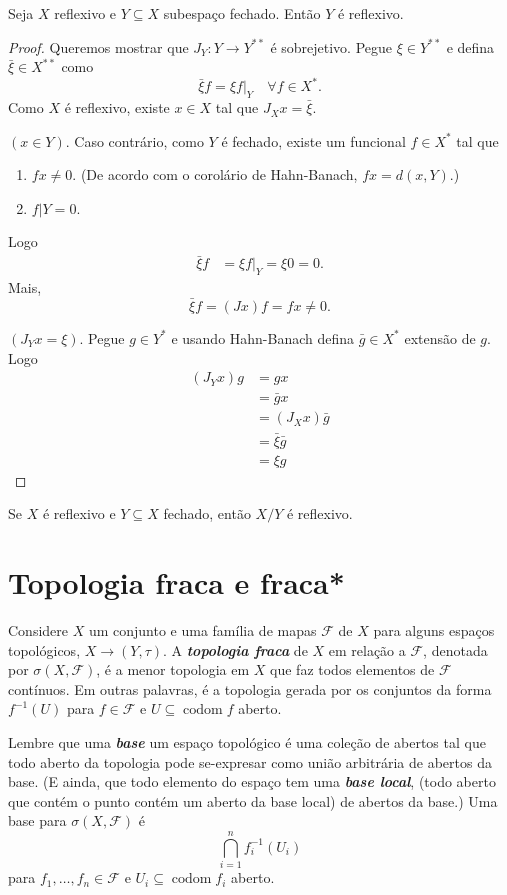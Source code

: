 \documentclass[portuguese]{article}
\theoremstyle{definition}
\begin{document}
	\begin{prop}
		Seja $X$ reflexivo e $Y\subseteq X$ subespaço fechado. Então $Y$ é reflexivo.
	\end{prop}
	\begin{proof}
		Queremos mostrar que $J_Y:Y\to Y^{**}$ é sobrejetivo. Pegue $\xi\in Y^{**}$ e defina $\bar{\xi}\in X^{**}$ como
		\[\bar{\xi}f=\xi f|_Y\quad\forall f\in X^*.\]
		Como $X$ é reflexivo, existe $x\in X$ tal que $J_Xx=\bar{\xi}$.
		
		$(x\in Y)$. Caso contrário, como $Y$ é fechado, existe um funcional $f\in X^*$ tal que
		\begin{enumerate}
			\item $fx\neq0$. (De acordo com o corolário de Hahn-Banach, $fx=d(x,Y)$.)
			\item $f|Y=0$.
		\end{enumerate}
		Logo
		\begin{align*}
			\bar{\xi}f&=\xi f|_Y=\xi0=0.
		\end{align*}
		Mais,
		\[\bar{\xi}f=(Jx)f=fx\neq0.\]
		
		$(J_Yx=\xi)$. Pegue $g\in Y^*$ e usando Hahn-Banach defina $\bar{g}\in X^*$ extensão de $g$. Logo
		\begin{align*}
			(J_Yx)g&=gx\\
			&=\bar{g}x\\
			&=(J_Xx)\bar g\\
			&=\bar{\xi}\bar{g}\\
			&=\xi g
		\end{align*}
	\end{proof}
	\begin{exer*}
		Se $X$ é reflexivo e $Y\subseteq X$ fechado, então $X/Y$ é reflexivo.
	\end{exer*}
	
	\section{Topologia fraca e fraca*}
	Considere $X$ um conjunto e uma família de mapas $\mathcal{F}$ de $X$ para alguns espaços topológicos, $X\to(Y,\tau)$. A \textbf{\textit{topologia fraca}} de $X$ em relação a $\mathcal{F}$, denotada por $\sigma(X,\mathcal{F})$, é a menor topologia em $X$ que faz todos elementos de $\mathcal{F}$ contínuos. Em outras palavras, é a topologia gerada por os conjuntos da forma $f^{-1}(U)$ para $f\in\mathcal{F}$ e $U\subseteq\operatorname{codom}f$ aberto.
	
	Lembre que uma \textbf{\textit{base}} um espaço topológico é uma coleção de abertos tal que todo aberto da topologia pode se-expresar como união arbitrária de abertos da base. (E ainda, que todo elemento do espaço tem uma \textbf{\textit{base local}}, (todo aberto que contém o punto contém um aberto da base local) de abertos da base.) Uma base para $\sigma(X,\mathcal{F})$ é
	\[\bigcap_{i=1}^n f^{-1}_i(U_i)\]
	para $f_1,\ldots,f_n\in\mathcal{F}$ e $U_i\subseteq\operatorname{codom}f_i$ aberto.
	
\end{document}
